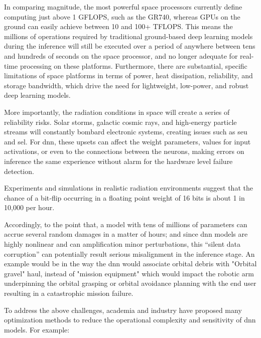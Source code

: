 In comparing magnitude, the most powerful space processors currently define computing just above 1 GFLOPS, such as the GR740, whereas GPUs on the ground can easily achieve between 10 and 100+ TFLOPS. This means the millions of operations required by traditional ground-based deep learning models during the inference will still be executed over a period of anywhere between tens and hundreds of seconds on the space processor, and no longer adequate for real-time processing on these platforms. Furthermore, there are substantial, specific limitations of space platforms in terms of power, heat dissipation, reliability, and storage bandwidth, which drive the need for lightweight, low-power, and robust deep learning models. 



More importantly, the radiation conditions in space will create a series of reliability risks. Solar storms, galactic cosmic rays, and high-energy particle streams will constantly bombard electronic systems, creating issues such as \gls{seu} and \gls{sel}. For \gls{dnn}, these upsets can affect the weight parameters, values for input activations, or even to the connections between the neurons, making errors on inference the same experience without alarm for the hardware level failure detection.



Experiments and simulations in realistic radiation environments suggest that the chance of a bit‐flip occurring in a floating point weight of 16 bits is about 1 in 10,000 per hour. \cite{venables2003enhancing}


Accordingly, to the point that, a model with tens of millions of parameters can accrue several random damages in a matter of hours; and since \gls{dnn} models are highly nonlinear and can amplification minor perturbations, this “silent data corruption” can potentially result serious misalignment in the inference stage. An example would be in the way the \gls{dnn} would associate orbital debris with "Orbital gravel" haul, instead of "mission equipment" which would impact the robotic arm underpinning the orbital grasping or orbital avoidance planning with the end user resulting in a catastrophic mission failure.



To address the above challenges, academia and industry have proposed many optimization methods to reduce the operational complexity and sensitivity of \gls{dnn} models. For example:


